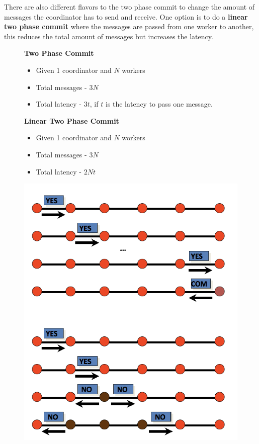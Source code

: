 There are also different flavors to the two phase commit to change the amount of messages the coordinator has to send and receive. One option is to do a \textbf{linear two phase commit} where the messages are passed from one worker to another, this reduces the total amount of messages but increases the latency.
\begin{figure}[H]
\begin{minipage}[t]{.5\textwidth}
\textbf{Two Phase Commit}
\begin{itemize}
\item Given 1 coordinator and $N$ workers
\item Total messages - $3N$
\item Total latency - $3t$, if $t$ is the latency to pass one message.
\end{itemize}
\textbf{Linear Two Phase Commit}
\begin{itemize}
\item Given 1 coordinator and $N$ workers
\item Total messages - $3N$
\item Total latency - $2Nt$
\end{itemize}
\end{minipage}
\begin{minipage}[t]{.5\textwidth}
\strut\vspace*{-\baselineskip}\newline
\includegraphics[width=\textwidth]{images/LTPC.PNG}
\label{LTPC}
\end{minipage}
\end{figure}

